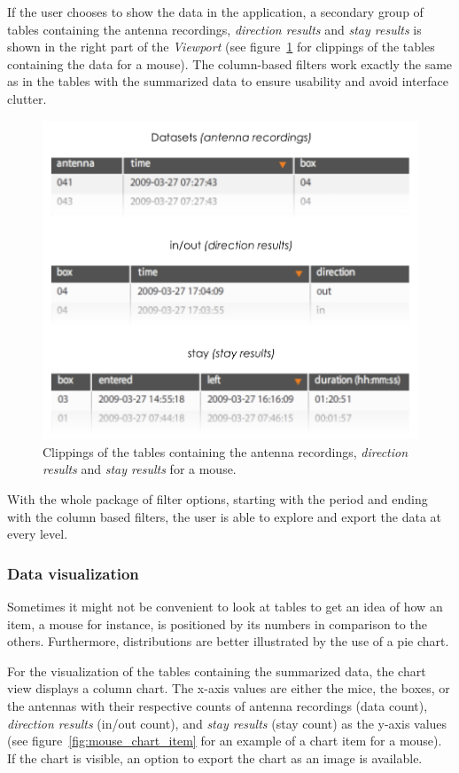 If the user chooses to show the data in the application, a secondary group of tables containing the antenna recordings, \textit{direction results} and \textit{stay results} is shown in the right part of the \textit{Viewport} (see figure~\ref{fig:overview_data} for clippings of the tables containing the data for a mouse). The column-based filters work exactly the same as in the tables with the summarized data to ensure usability and avoid interface clutter. 

\begin{figure}[htpb]
\begin{center}
  \includegraphics[width=.66\textwidth]{assets/pdf/overview_data.pdf}
  \caption[Clippings of the tables containing the results for a mouse]{Clippings of the tables containing the antenna recordings, \textit{direction results} and \textit{stay results} for a mouse.}
  \label{fig:overview_data}
\end{center}
\end{figure}  

With the whole package of filter options, starting with the period and ending with the column based filters, the user is able to explore and export the data at every level.       

\subsubsection{Data visualization}
\label{subsubsec:datavis}

Sometimes it might not be convenient to look at tables to get an idea of how an item, a mouse for instance, is positioned by its numbers in comparison to the others. Furthermore, distributions are better illustrated by the use of a pie chart. 

For the visualization of the tables containing the summarized data, the chart view displays a column chart. The x-axis values are either the mice, the boxes, or the antennas with their respective counts of antenna recordings (data count), \textit{direction results} (in/out count), and \textit{stay results} (stay count) as the y-axis values (see figure~\ref{fig:mouse_chart_item} for an example of a chart item for a mouse). If the chart is visible, an option to export the chart as an image is available.


